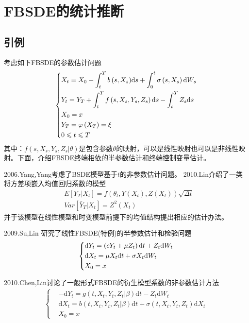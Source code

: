 \section{FBSDE的统计推断}
	\subsection{引例}
		考虑如下FBSDE的参数估计问题
				\begin{align}
				\label{积分型FBSDE}
						\centering
					\left\{\begin{lgathered}
						{{X_t} = {X_0} + \int_t^T {b\left( {s,{X_s}} \right)} \mathrm{d}s + \int_0^t {\sigma \left( {s,{X_s}} \right)\mathrm{d}{W_s}} }\\
						{{Y_t} = {Y_T} + \int_t^T {f\left( {s,{X_s},{Y_s},{Z_s}} \right)\mathrm{d}s}  - \int_t^T {{Z_s}\mathrm{d}s} }\\
						{{X_0} = x}\\
						{{Y_T} = \varphi \left( {{X_T}} \right) = \xi }\\
						{0 \leqslant t \leqslant T}
					\end{lgathered} \right.
				\end{align}
		其中：$f\left( {s,{X_s},{Y_s},{Z_s}|\theta} \right)$是包含参数$\theta$的映射，可以是线性映射也可以是非线性映射。下面，介绍FBSDE终端相依的半参数估计和终端控制变量估计。
		\par
		2006.Yang,Yang\cite{2006.Yang}考虑了BSDE模型基于$t$的非参数估计问题。
		2010.Lin\cite{2010.Lin}介绍了一类将方差项嵌入均值回归系数的模型
		\begin{align*}
		&E\left[ {{Y_T}|{X_t}} \right] = f\left( {{\theta _t},Y\left( {{X_t}} \right),Z\left( {{X_t}} \right)} \right)\sqrt {\Delta t} \\
		&Var\left[ {{{\bar Y}_T}|{X_t}} \right] = {Z^2}\left( {{X_t}} \right)
		\end{align*}
		并于该模型在线性模型和时变模型前提下的均值结构提出相应的估计办法。
		\par
		2009.Su,Lin \cite{2009.Su}研究了线性FBSDE(特例)的半参数估计和检验问题
		\begin{equation*}
			\centering
			\left\{\begin{lgathered}
			{\mathrm{d}{Y_t} = \left( {c{Y_t} + \mu {Z_t}} \right)\mathrm{d}t + {Z_t}\mathrm{d}{W_t}}\\
			{\mathrm{d}{X_t} = \mu {X_t}\mathrm{d}t + \sigma {X_t}\mathrm{d}{W_t}}\\
			{X_0=x}
			\end{lgathered} \right.
		\end{equation*}
		\par
		2010.Chen,Lin\cite{2010.Chen}讨论了一般形式FBSDE的衍生模型系数的非参数估计方法
		\begin{align*}
		\left\{
			\begin{aligned}
				&-\mathrm{d}Y_t = g(t,X_t,Y_t,Z_t|\beta)\mathrm{d}t - Z_t\mathrm{d}W_t\\
				&\mathrm{d}X_t = b(t,X_t,Y_t,Z_t|\beta)\mathrm{d}t +\sigma(t,X_t,Y_t,Z_t)\mathrm{d}X_t\\
				&X_0 = x
			\end{aligned}
		\right.
		\end{align*}


